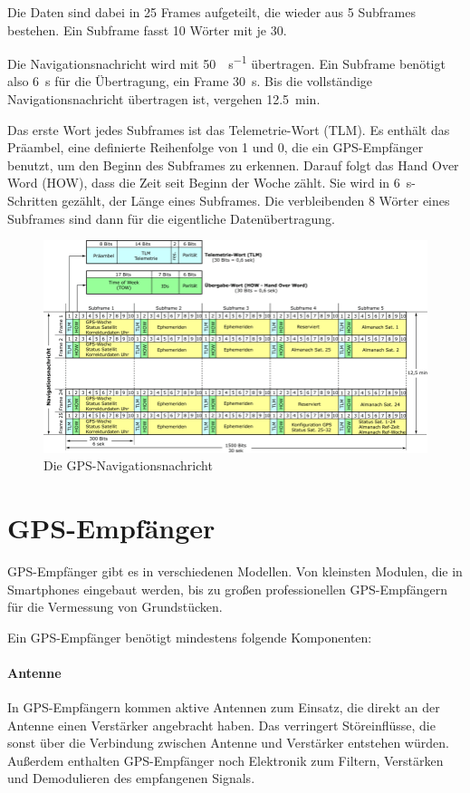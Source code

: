 \documentclass[12pt,a4paper]{scrartcl}
\begin{document}
Die Daten sind dabei in 25 Frames aufgeteilt, die wieder aus 5 Subframes bestehen. Ein Subframe fasst 10 Wörter mit je \SI{30}{\bit}.

Die Navigationsnachricht wird mit \SI{50}{\bit\per\second} übertragen.
Ein Subframe benötigt also \SI{6}{\second} für die Übertragung, ein Frame \SI{30}{\second}. Bis die vollständige Navigationsnachricht übertragen ist, vergehen \SI{12.5}{\minute}.

Das erste Wort jedes Subframes ist das Telemetrie-Wort (TLM). Es enthält das Präambel, eine definierte Reihenfolge von 1 und 0, die ein GPS-Empfänger benutzt, um den Beginn des Subframes zu erkennen.  Darauf folgt das Hand Over Word (HOW), dass die Zeit seit Beginn der Woche zählt. Sie wird in \SI{6}{\second}-Schritten gezählt, der Länge eines Subframes. Die verbleibenden 8 Wörter eines Subframes sind dann für die eigentliche Datenübertragung.

\begin{figure}[H]
\centering
\includegraphics[width=\textwidth]{img/navigation_message.png}
\caption{Die GPS-Navigationsnachricht\cite{infotip_gps}}
\label{fig:nm}
\end{figure}

\section{GPS-Empfänger}
GPS-Empfänger gibt es in verschiedenen Modellen. Von kleinsten Modulen, die in Smartphones eingebaut werden, bis zu großen professionellen GPS-Empfängern für die Vermessung von Grundstücken.

Ein GPS-Empfänger benötigt mindestens folgende Komponenten:

\paragraph{Antenne}
In GPS-Empfängern kommen aktive Antennen zum Einsatz, die direkt an der Antenne einen Verstärker angebracht haben. Das verringert Störeinflüsse, die sonst über die Verbindung zwischen Antenne und Verstärker entstehen würden. Außerdem enthalten GPS-Empfänger noch Elektronik zum Filtern, Verstärken und Demodulieren des empfangenen Signals.
\end{document}
